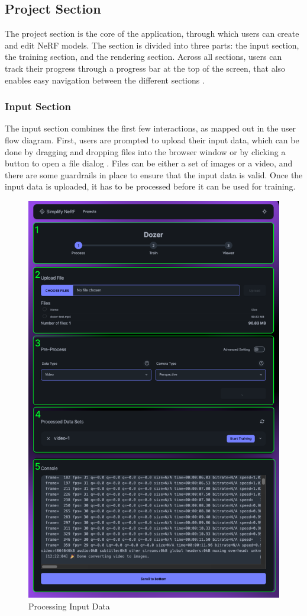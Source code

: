 \subsection*{Project Section}

The project section is the core of the application, through which users can create and edit NeRF models.
The section is divided into three parts: the input section, the training section, and the rendering section.
Across all sections, users can track their progress through a progress bar at the top of the screen, that also enables easy navigation between the different sections .

\subsubsection*{Input Section}

The input section combines the first few interactions, as mapped out in the user flow diagram.
First, users are prompted to upload their input data, which can be done by dragging and dropping files into the browser window or by clicking a button to open a file dialog .
Files can be either a set of images or a video, and there are some guardrails in place to ensure that the input data is valid.
Once the input data is uploaded, it has to be processed before it can be used for training.

\begin{figure}[h!]
  \centering
  \includegraphics[width=.7\textwidth]{figures/view-process.png}
  \caption{Processing Input Data}
  \label{fig:design:input-section}
\end{figure}

